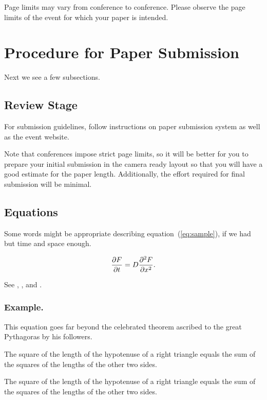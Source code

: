 \documentclass{ifacconf}
\begin{document}
Page limits may vary from conference to conference. Please observe the 
page limits of the event for which your paper is intended.


\section{Procedure for Paper Submission}

Next we see a few subsections.

\subsection{Review Stage}

For submission guidelines, follow instructions on paper submission
system as well as the event website.

Note that conferences impose strict page limits, so it will be better
for you to prepare your initial submission in the camera ready layout
so that you will have a good estimate for the paper
length. Additionally, the effort required for final submission will be
minimal.

\subsection{Equations}

Some words might be appropriate describing equation~(\ref{eq:sample}), if 
we had but time and space enough. 

\begin{equation} \label{eq:sample}
{{\partial F}\over {\partial t}} = D{{\partial^2 F}\over {\partial x^2}}.
\end{equation}

See \cite{Abl:56}, \cite{AbTaRu:54}, \cite{Keo:58} and \cite{Pow:85}.

\subsubsection{Example.} This equation goes far beyond the
celebrated theorem ascribed to the great Pythagoras by his followers.

\begin{thm}   %
The square of the length of the hypotenuse of a right triangle equals
the sum of the squares of the lengths of the other two sides.
\end{thm}

\begin{pf}    %
The square of the length of the hypotenuse of a right triangle equals the sum of the squares 
of the lengths of the other two sides.
\end{pf}
\end{document}
